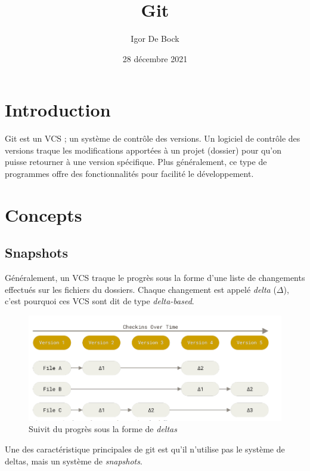 \documentclass[a4paper, 12pt]{article}
\author{Igor De Bock}
\date{28 décembre 2021}
\title{Git}
\begin{document}
    \maketitle
    \tableofcontents

    \section{Introduction}

    Git est un VCS ; un système de contrôle des versions. Un logiciel de
    contrôle des versions traque les modifications apportées à un projet
    (dossier) pour qu'on puisse retourner à une version spécifique. Plus
    généralement, ce type de programmes offre des fonctionnalités pour facilité
    le développement.

    \section{Concepts}

    \subsection{Snapshots}

    Généralement, un VCS traque le progrès sous la forme d'une liste de
    changements effectués sur les fichiers du dossiers. Chaque changement est
    appelé \textit{delta} ($\Delta$), c'est pourquoi ces VCS sont dit de type 
    \textit{delta-based}.

    \begin{figure}[H]
        \centering
        \includegraphics[scale=0.54]{figs/delta_based_cvs.png}
        \caption{Suivit du progrès sous la forme de \emph{deltas}}
        \label{fig:graphcommit}
    \end{figure}

    Une des caractéristique principales de git est qu'il n'utilise pas le
    système de deltas, mais un système de \emph{\textit{snapshots}}.
\end{document}

